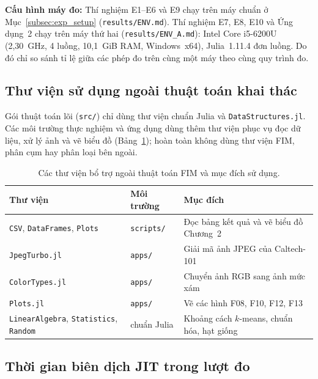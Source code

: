 \textbf{Cấu hình máy đo:} Thí nghiệm E1--E6 và E9 chạy trên máy chuẩn ở Mục~\ref{subsec:exp_setup} (\texttt{results/ENV.md}). Thí nghiệm E7, E8, E10 và Ứng dụng~2 chạy trên máy thứ hai (\texttt{results/ENV\_A.md}): Intel Core i5-6200U (2,30~GHz, 4 luồng, 10,1~GiB RAM, Windows~x64), Julia~1.11.4 đơn luồng. Do đó chỉ so sánh tỉ lệ giữa các phép đo trên cùng một máy theo cùng quy trình đo.

\subsection{Thư viện sử dụng ngoài thuật toán khai thác}
\label{subsec:appendix_libraries}

Gói thuật toán lõi (\texttt{src/}) chỉ dùng thư viện chuẩn Julia và \texttt{DataStructures.jl}. Các môi trường thực nghiệm và ứng dụng dùng thêm thư viện phục vụ đọc dữ liệu, xử lý ảnh và vẽ biểu đồ (Bảng~\ref{tab:appendix_libraries}); hoàn toàn không dùng thư viện FIM, phân cụm hay phân loại bên ngoài.

\begin{table}[!t]
\centering
\caption{Các thư viện bổ trợ ngoài thuật toán FIM và mục đích sử dụng.}
\label{tab:appendix_libraries}
\scriptsize
\begin{tabular}{@{}p{2.6cm}p{1.3cm}p{4.1cm}@{}}
\toprule
Thư viện & Môi trường & Mục đích \\
\midrule
\texttt{CSV}, \texttt{DataFrames}, \texttt{Plots} & \texttt{scripts/} & Đọc bảng kết quả và vẽ biểu đồ Chương~2 \\
\texttt{JpegTurbo.jl} & \texttt{apps/} & Giải mã ảnh JPEG của Caltech-101 \\
\texttt{ColorTypes.jl} & \texttt{apps/} & Chuyển ảnh RGB sang ảnh mức xám \\
\texttt{Plots.jl} & \texttt{apps/} & Vẽ các hình F08, F10, F12, F13 \\
\texttt{LinearAlgebra}, \texttt{Statistics}, \texttt{Random} & chuẩn Julia & Khoảng cách $k$-means, chuẩn hóa, hạt giống \\
\bottomrule
\end{tabular}
\end{table}

\subsection{Thời gian biên dịch JIT trong lượt đo}
\label{subsec:appendix_jit}

